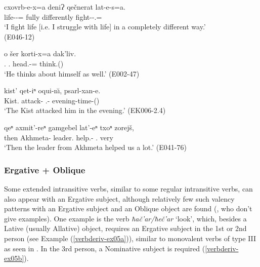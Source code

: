 \begin{exe}
	\ex\label{verbderiv-ex04}
	\begin{xlist}
		
		
			\ex\label{verbderiv-ex04a}
			\gll cxovrb-e-x=a deniɁ qečnerat lat-e-s=a.  \\
			life-{\Obl}-\textbf{{\Cont}}={\Emph} fully differently fight-{\Npst}-{\Fsg}.\textbf{{\Nom}}={\Emph} \\
			\trans `I fight life [i.e. I struggle with life] in a completely different way.' \\
			\hfill (E046-12)
		
		
		
			\ex\label{verbderiv-ex04b}
			\gll o šer korti-x=a dak'liv. \\
			{\Dist}.\textbf{{\Nom}} {\Refl}.{\Poss} head.{\Obl}-\textbf{{\Cont}}={\Add} think.{\Ipfv}({\Npst}) \\
			\trans `He thinks about himself as well.' 
			\hfill (E002-47)
		
		
		
			\ex\label{verbderiv-ex04c}
			\gll kist' qet-iⁿ oqui-n\u{\i}, psarl-xan-e. \\
			Kist.\textbf{{\Nom}} attack-{\Aor} {\Dist}.{\Obl}-\textbf{{\Dat}} evening-time-{\Obl}({\Ess}) \\
			\trans `The Kist attacked him in the evening.'
			\hfill (EK006-2.4)
		
		
		
			\ex\label{verbderiv-ex04d}
			\gll qeⁿ axmit'-reⁿ gamgebel lat'-eⁿ txoⁿ zorejš, \\
			then Akhmeta-{\Elat} leader.\textbf{{\Nom}} help.{\Pfv}-{\Aor} {\Fpl}.\textbf{{\Dat}} very \\
			\trans `Then the leader from Akhmeta helped us a lot.'
			\hfill (E041-76)
		
		
		
	\end{xlist}
\end{exe}


\subsubsection{Ergative + Oblique}

Some extended intransitive verbs, similar to some regular intransitive verbs, can also appear with an Ergative subject, although relatively few such valency patterns with an Ergative subject and an Oblique object are found (\cite[195]{holiskygagua}, who don't give examples). One example is the verb \textit{ħač'ar/ħeč'ar} `look', which, besides a Lative (usually Allative) object, requires an Ergative subject in the 1st or 2nd person (see Example (\ref{verbderiv-ex05a})), similar to monovalent verbs of type III as seen in . In the 3rd person, a Nominative subject is required (\ref{verbderiv-ex05b}).

